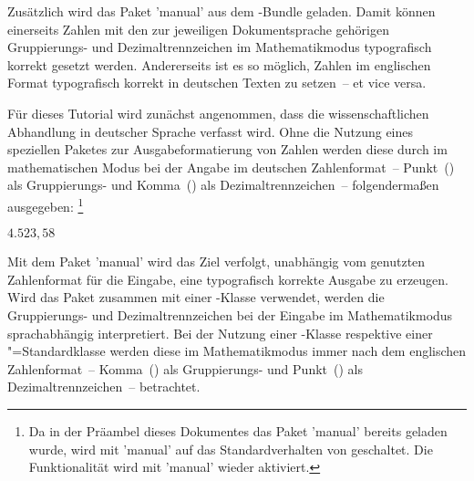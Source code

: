 \documentclass[english,ngerman]{tudscrartcl}
\begin{document}
\begin{Entity}{}
\begin{Preamble}
\end{Preamble}
%
Zusätzlich wird das Paket 'manual' aus dem \TUDScript-Bundle 
geladen. Damit können einerseits Zahlen mit den zur jeweiligen Dokumentsprache
gehörigen Gruppierungs- und Dezimaltrennzeichen im Mathematikmodus typografisch
korrekt gesetzt werden. Andererseits ist es so möglich, Zahlen im englischen
Format typografisch korrekt in deutschen Texten zu setzen~-- et vice versa.
%
\begin{Preamble}
\usepackage{mathswap}
\end{Preamble}
%
%
Für dieses Tutorial wird zunächst angenommen, dass die wissenschaftlichen 
Abhandlung in deutscher Sprache verfasst wird. Ohne die Nutzung eines 
speziellen Paketes zur Ausgabeformatierung von Zahlen werden diese durch 
 im mathematischen Modus bei der Angabe im deutschen 
Zahlenformat~-- Punkt~() als Gruppierungs- und Komma~(\PValue{,}) als 
Dezimaltrennzeichen~-- folgendermaßen ausgegeben:%
\footnote{%
  Da in der Präambel dieses Dokumentes das Paket 'manual' 
  bereits geladen wurde, wird mit 'manual' auf das 
  Standardverhalten von  geschaltet. Die Funktionalität wird mit 
  'manual' wieder aktiviert.%
}
%
\begin{Trunk*}
\mathswapoff
\(4.523,58\)
\mathswapon

\end{Trunk*}
%
Mit dem Paket 'manual' wird das Ziel verfolgt, unabhängig vom 
genutzten Zahlenformat für die Eingabe, eine typografisch korrekte Ausgabe zu 
erzeugen. Wird das Paket zusammen mit einer \TUDScript-Klasse verwendet, werden 
die Gruppierungs- und Dezimaltrennzeichen bei der Eingabe im Mathematikmodus 
sprachabhängig interpretiert. Bei der Nutzung einer \KOMAScript-Klasse 
respektive einer "=Standardklasse werden diese im Mathematikmodus 
immer nach dem englischen Zahlenformat~-- Komma~(\PValue{,}) als Gruppierungs- 
und Punkt~(\PValue{,}) als Dezimaltrennzeichen~-- betrachtet.


\end{Entity}
\end{document}
